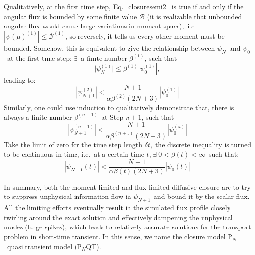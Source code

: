 \documentclass[review]{elsarticle}
\newcommand{\psii}[1]{\psi_\ensuremath{{#1}}}
\begin{document}
Qualitatively, at the first time step, Eq.~\eqref{closuresemi2}~is true if and only if the angular flux is bounded by some finite value $\mathcal{B}$ (it is realizable that unbounded angular flux would cause large variations in moment space),~i.e.~$|\psi(\mu)^{(1)}|\leq\mathcal{B}^{(1)}$, so reversely, it tells us every other moment must be bounded. Somehow, this is equivalent to give the relationship between $\psii{N}$~and $\psii{0}$~at the first time step: $\exists$~a finite number $\beta^{(1)}$, such that
\begin{equation}
\lvert\psii{N}^{(1)}\rvert\leq\beta^{(1)}|\psii{0}^{(1)}|,
\end{equation}
leading to:
\begin{equation}
|\psii{N+1}^{(2)}|<\frac{N+1}{\alpha\beta^{(2)}(2N+3)}|\psii{0}^{(1)}|
\end{equation}
Similarly, one could use induction to qualitatively demonstrate that, there is always a finite number $\beta^{(n+1)}$~at Step $n+1$, such that
\begin{equation}
|\psii{N+1}^{(n+1)}|<\frac{N+1}{\alpha\beta^{(n+1)}(2N+3)}|\psii{0}^{(n)}|
\end{equation}
Take the limit of zero for the time step length $\delta t$,~the discrete inequality is turned to be continuous in time, i.e.~at a certain time $t$, $\exists~0<\beta(t)<\infty$~such that:
\begin{equation}\label{fld}
|\psii{N+1}(t)|<\frac{N+1}{\alpha\beta(t)(2N+3)}|\psii{0}(t)|
\end{equation}

In summary, both the moment-limited and flux-limited diffusive closure are to try to suppress unphysical information flow in $\psii{N+1}$~and bound it by the scalar flux. All the limiting efforts eventually result in the simulated flux profile closely twirling around the exact solution and effectively dampening the unphysical modes (large spikes), which leads to relatively accurate solutions for the transport problem in short-time transient. In this sense, we name the closure model P$_N$~quasi transient model (P$_N$QT). 
\end{document}
